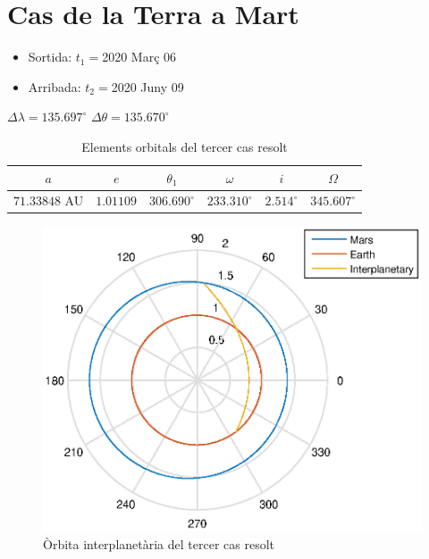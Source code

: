 \section{Cas de la Terra a Mart}
\begin{itemize}
	\item Sortida: $t_{1}=$2020 Març 06
	\item Arribada: $t_{2}=$2020 Juny 09
\end{itemize}
$\Delta\lambda=135.697^{\circ}$
$\Delta\theta=135.670^{\circ}$
\begin{table}[h!]
	\centering
	\begin{tabular}{ |c|c|c|c|c|c|}
		\hline
		$a$ & $e$ & $\theta_{1}$ & $\omega$ & $i$ & $\Omega$ \\ \hline
		$71.33848$ AU  & $1.01109$ & $306.690^{\circ}$ & $233.310^{\circ}$ & $2.514^{\circ}$ & $345.607^{\circ}$ \\ \hline
	\end{tabular}
	\caption{Elements orbitals del tercer cas resolt}
\end{table}
\begin{figure}[H]
	\centering
	\includegraphics[scale=0.95]{./plots/ex3}
	\caption{Òrbita interplanetària del tercer cas resolt}
\end{figure}

